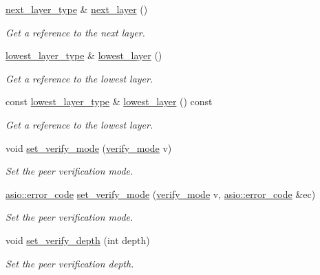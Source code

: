 \begin{DoxyCompactItemize}
\hyperlink{classasio_1_1ssl_1_1stream_ae0c066ed414d0d7898b9d2e7998ef98e}{next\+\_\+layer\+\_\+type} \& \hyperlink{classasio_1_1ssl_1_1stream_ae923c2a65c0f6fec01a335384f752d12}{next\+\_\+layer} ()
\begin{DoxyCompactList}\small\item\em Get a reference to the next layer. \end{DoxyCompactList}\item 
\hyperlink{classasio_1_1ssl_1_1stream_ae3642d059991c8d0285b888673c677ca}{lowest\+\_\+layer\+\_\+type} \& \hyperlink{classasio_1_1ssl_1_1stream_adaab4ba6e92ef6b2009d103bb71bfdef}{lowest\+\_\+layer} ()
\begin{DoxyCompactList}\small\item\em Get a reference to the lowest layer. \end{DoxyCompactList}\item 
const \hyperlink{classasio_1_1ssl_1_1stream_ae3642d059991c8d0285b888673c677ca}{lowest\+\_\+layer\+\_\+type} \& \hyperlink{classasio_1_1ssl_1_1stream_aeff4c4230946453c88b5490a7037e4ed}{lowest\+\_\+layer} () const 
\begin{DoxyCompactList}\small\item\em Get a reference to the lowest layer. \end{DoxyCompactList}\item 
void \hyperlink{classasio_1_1ssl_1_1stream_aa99e1eb0409e05c3439d478229bf0a0c}{set\+\_\+verify\+\_\+mode} (\hyperlink{namespaceasio_1_1ssl_aa6497e51bc608f2397a731a14f80b563}{verify\+\_\+mode} v)
\begin{DoxyCompactList}\small\item\em Set the peer verification mode. \end{DoxyCompactList}\item 
\hyperlink{classasio_1_1error__code}{asio\+::error\+\_\+code} \hyperlink{classasio_1_1ssl_1_1stream_ac18bf1b1e08309c44af485f4f80f88cb}{set\+\_\+verify\+\_\+mode} (\hyperlink{namespaceasio_1_1ssl_aa6497e51bc608f2397a731a14f80b563}{verify\+\_\+mode} v, \hyperlink{classasio_1_1error__code}{asio\+::error\+\_\+code} \&ec)
\begin{DoxyCompactList}\small\item\em Set the peer verification mode. \end{DoxyCompactList}\item 
void \hyperlink{classasio_1_1ssl_1_1stream_a9eb5030ca05dee079ded85891da9a7de}{set\+\_\+verify\+\_\+depth} (int depth)
\begin{DoxyCompactList}\small\item\em Set the peer verification depth. \end{DoxyCompactList}\item 

\end{DoxyCompactItemize}
